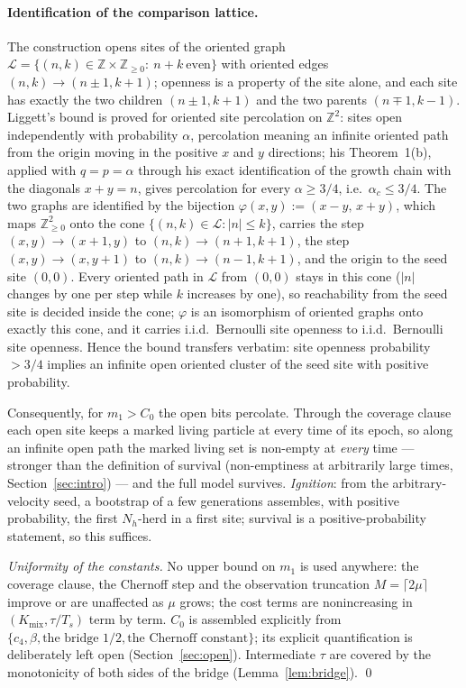 \documentclass[11pt]{article}
\newcommand{\Kmix}{K_{\mathrm{mix}}}
\newcommand{\Ts}{T_s}
\begin{document}
\paragraph{Identification of the comparison lattice.}
The construction opens sites of the oriented graph
$\mathcal{L}=\{(n,k)\in\mathbb{Z}\times\mathbb{Z}_{\ge0}:\ n+k\ \text{even}\}$
with oriented edges $(n,k)\to(n\pm1,k+1)$; openness is a property of the
site alone, and each site has exactly the two children $(n\pm1,k+1)$ and
the two parents $(n\mp1,k-1)$. Liggett's bound \cite{liggett95} is proved
for oriented site percolation on $\mathbb{Z}^2$: sites open independently
with probability $\alpha$, percolation meaning an infinite oriented path
from the origin moving in the positive $x$ and $y$ directions; his
Theorem~1(b), applied with $q=p=\alpha$ through his exact identification of
the growth chain with the diagonals $x+y=n$, gives percolation for every
$\alpha\ge3/4$, i.e.\ $\alpha_c\le3/4$. The two graphs are identified by
the bijection $\varphi(x,y):=(x-y,\,x+y)$, which maps $\mathbb{Z}^2_{\ge0}$
onto the cone $\{(n,k)\in\mathcal{L}:|n|\le k\}$, carries the step
$(x,y)\to(x+1,y)$ to $(n,k)\to(n+1,k+1)$, the step $(x,y)\to(x,y+1)$ to
$(n,k)\to(n-1,k+1)$, and the origin to the seed site $(0,0)$. Every
oriented path in $\mathcal{L}$ from $(0,0)$ stays in this cone ($|n|$
changes by one per step while $k$ increases by one), so reachability from
the seed site is decided inside the cone; $\varphi$ is an isomorphism of
oriented graphs onto exactly this cone, and it carries i.i.d.\ Bernoulli
site openness to i.i.d.\ Bernoulli site openness. Hence the bound
transfers verbatim: site openness probability $>3/4$ implies an infinite
open oriented cluster of the seed site with positive probability.

Consequently, for $m_1>C_0$ the open bits percolate. Through the coverage
clause each open site keeps a marked living particle at every time of its
epoch, so along an infinite open path the marked living set is non-empty at
\emph{every} time --- stronger than the definition of survival
(non-emptiness at arbitrarily large times, Section~\ref{sec:intro}) --- and
the full model survives. \emph{Ignition}: from the
arbitrary-velocity seed, a bootstrap of a few generations assembles, with
positive probability, the first $N_h$-herd in a first site; survival is a
positive-probability statement, so this suffices.

\emph{Uniformity of the constants.} No upper bound on $m_1$ is used
anywhere: the coverage clause, the Chernoff step and the observation
truncation $M=\lceil2\mu\rceil$ improve or are unaffected as $\mu$ grows;
the cost terms are nonincreasing in $(\Kmix,\tau/\Ts)$ term by term. $C_0$
is assembled explicitly from $\{c_4,\beta,\text{the bridge }1/2,\text{the
Chernoff constant}\}$; its explicit quantification is deliberately left
open (Section~\ref{sec:open}). Intermediate $\tau$ are covered by the
monotonicity of both sides of the bridge (Lemma~\ref{lem:bridge}). \qed
\end{document}
